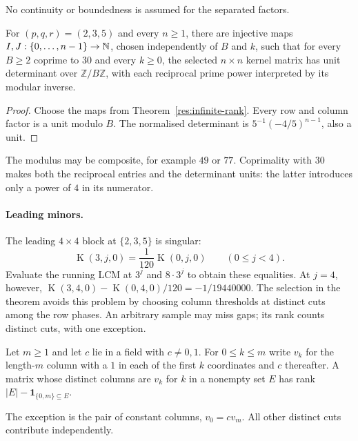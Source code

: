 \documentclass[11pt]{article}
\newcommand{\Kernel}{\operatorname{K}}
\begin{document}
No continuity or boundedness is assumed for the separated factors.

\begin{corollary}
\label{res:admissible-modular-minors}
For $(p,q,r)=(2,3,5)$ and every $n\ge1$, there are injective maps
$I,J:\{0,\ldots,n-1\}\to\mathbb{N}$, chosen independently of $B$ and $k$, such that
for every $B\ge2$ coprime to $30$ and every $k\ge0$, the selected $n\times n$
kernel matrix has unit determinant over $\mathbb Z/B\mathbb Z$, with each
reciprocal prime power interpreted by its modular inverse.
\end{corollary}
\begin{proof}
Choose the maps from Theorem~\ref{res:infinite-rank}.  Every row and column
factor is a unit modulo $B$.  The normalised determinant is
$5^{-1}(-4/5)^{n-1}$, also a unit.
\end{proof}
The modulus may be composite, for example $49$ or $77$.  Coprimality
with $30$ makes both the reciprocal entries and the determinant units:
the latter introduces only a power of $4$ in its numerator.





\paragraph{Leading minors.}
The leading $4\times4$ block at $\{2,3,5\}$ is singular:
\[
 \Kernel(3,j,0)=\frac1{120}\Kernel(0,j,0)\qquad(0\le j<4).
\]
Evaluate the running LCM at $3^j$ and $8\cdot3^j$ to obtain these equalities.
At $j=4$, however,
$\Kernel(3,4,0)-\Kernel(0,4,0)/120=-1/19440000$.
The selection in the theorem avoids this problem by choosing column
thresholds at distinct cuts among the row phases. An arbitrary
sample may miss gaps; its rank counts distinct cuts, with one exception.


\begin{proposition}\label{res:finite-cut-rank}
Let $m\ge1$ and let $c$ lie in a field with $c\ne 0,1$.
For $0\le k\le m$ write $v_k$ for the length-$m$ column with a $1$ in each of
the first $k$ coordinates and $c$ thereafter.
A matrix whose distinct columns are $v_k$ for $k$ in a nonempty set $E$ has
rank $|E|-\mathbf 1_{\{0,m\}\subseteq E}$.
\end{proposition}

The exception is the pair of constant columns, $v_0=c v_m$.
All other distinct cuts contribute independently.
\end{document}
